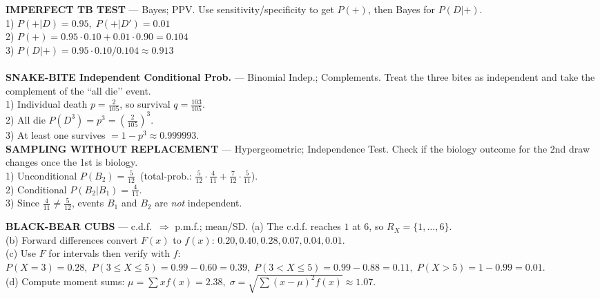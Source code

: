 \documentclass[landscape,0.4pt]{article}
\begin{document}
\begin{multicols*}{6}
\textbf{\tiny{IMPERFECT TB TEST}} — Bayes; PPV.  Use sensitivity/specificity to get $P(+)$, then Bayes for $P(D|+)$.\\
1) $P(+|D)=0.95,\;P(+|D')=0.01$\\
2) $P(+)=0.95\cdot0.10+0.01\cdot0.90=0.104$\\
3) $P(D|+)=0.95\cdot0.10/0.104\approx0.913$\\
\\

\textbf{\tiny{SNAKE-BITE Independent Conditional Prob.}} — Binomial Indep.; Complements.  Treat the three bites as independent and take the complement of the “all die’’ event.\\
1) Individual death $p=\tfrac{2}{105}$, so survival $q=\tfrac{103}{105}$.\\
2) All die $P(D^3)=p^3=(\tfrac{2}{105})^3$.\\
3) At least one survives $=1-p^3\approx0.999993$.\\[-2pt]

\textbf{\tiny{SAMPLING WITHOUT REPLACEMENT}} — Hypergeometric; Independence Test.  Check if the biology outcome for the 2nd draw changes once the 1st is biology.\\
1) Unconditional $P(B_2)=\frac{5}{12}$ \,(total-prob.: $\frac{5}{12}\!\cdot\!\frac{4}{11}+\frac{7}{12}\!\cdot\!\frac{5}{11}$).\\
2) Conditional $P(B_2|B_1)=\frac{4}{11}$.\\
3) Since $\frac{4}{11}\ne\frac{5}{12}$, events $B_1$ and $B_2$ are \emph{not} independent.\\
\vspace{3pt}


\textbf{\tiny{BLACK-BEAR CUBS}} — c.d.f.\ $\Rightarrow$ p.m.f.; mean/SD.  
(a) The c.d.f. reaches $1$ at $6$, so $R_X=\{1,\dots,6\}$.\\
(b) Forward differences convert $F(x)$ to $f(x)$: $0.20,0.40,0.28,0.07,0.04,0.01$.\\
(c) Use $F$ for intervals then verify with $f$:  
$P(X=3)=0.28,\;P(3\le X\le5)=0.99-0.60=0.39,\;P(3<X\le5)=0.99-0.88=0.11,\;P(X>5)=1-0.99=0.01$.\\
(d) Compute moment sums: $\mu=\sum x f(x)=2.38,\;\sigma=\sqrt{\sum (x-\mu)^2f(x)}\approx1.07$.\\[-2pt]



\end{multicols*}
\end{document}
